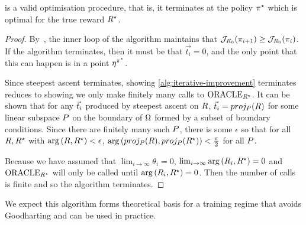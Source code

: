 \begin{proposition}
 is a valid optimisation procedure, that is, it terminates at the policy $\pi^\star$ which is optimal for the true reward $R^\star$. 
\end{proposition}
\begin{proof}
By~, the inner loop of the algorithm maintains that $\mathcal{J}_{R_0}(\pi_{i+1}) \geq \mathcal{J}_{R_0}(\pi_i)$. If the algorithm terminates, then it must be that $\vec{t_i} = 0$, and the only point that this can happen is in a point $\eta^{\pi^\star}$. 

Since steepest ascent terminates, showing \cref{alg:iterative-improvement} terminates reduces to showing we only make finitely many calls to $\text{ORACLE}_{R^\star}$. It can be shown that for any $\vec{t}_i$ produced by steepest ascent on $R$, $\vec{t}_i = proj_{P}(R)$ for some linear subspace $P$ on the boundary of $\Omega$ formed by a subset of boundary conditions. Since there are finitely many such $P$, there is some $\epsilon$ so that for all $R, R^\star$ with $\mathrm{arg}\left({R}, {R^\star}\right) < \epsilon$, $\mathrm{arg}\left({proj_{P}(R)}, {proj_{P}(R^\star)}\right) < \frac{\pi}{2}$ for all $P$.

Because we have assumed that $\lim_{i \to \infty} \theta_i = 0$, $\lim_{i \to \infty} \mathrm{arg}\left({R_i}, {R^\star}\right) = 0$ and $\text{ORACLE}_{R^\star}$ will only be called until $\mathrm{arg}\left({R_i}, {R^\star}\right) = 0$. Then the number of calls is finite and so the algorithm terminates. \end{proof}

We expect this algorithm forms theoretical basis for a  training regime that avoids Goodharting and can be used in practice.
